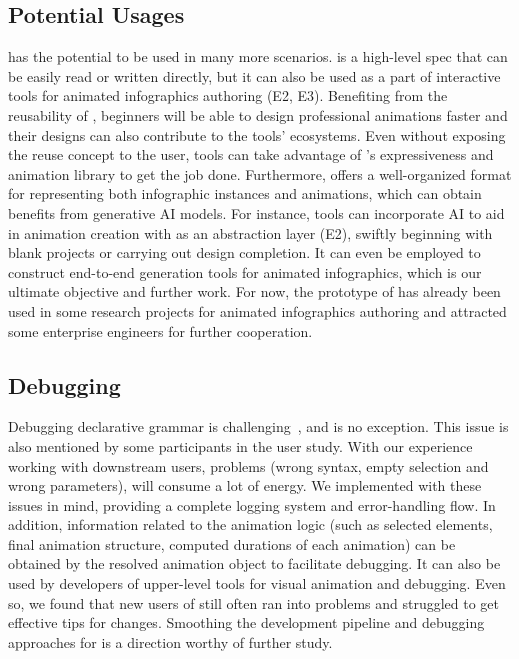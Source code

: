 \subsection{Potential Usages}
\gaia{} has the potential to be used in many more scenarios.
\gaia{} is a high-level spec that can be easily read or written directly, but it can also be used as a part of interactive tools for animated infographics authoring (E2, E3). 
Benefiting from the reusability of \gaia{}, beginners will be able to design professional animations faster and their designs can also contribute to the tools' ecosystems.
Even without exposing the reuse concept to the user, tools can take advantage of \gaia{}'s expressiveness and animation library to get the job done.
Furthermore, \gaia{} offers a well-organized format for representing both infographic instances and animations, which can obtain benefits from generative AI models. 
For instance, tools can incorporate AI to aid in animation creation with \gaia{} as an abstraction layer (E2), swiftly beginning with blank projects or carrying out design completion. 
It can even be employed to construct end-to-end generation tools for animated infographics, which is our ultimate objective and further work.
For now, the prototype of \gaia{} has already been used in some research projects for animated infographics authoring and attracted some enterprise engineers for further cooperation.

\subsection{Debugging}
Debugging declarative grammar is challenging~\cite{satyanarayan2015reactive}, and \gaia{} is no exception.
This issue is also mentioned by some participants in the user study.
With our experience working with downstream users, problems (\eg wrong syntax, empty selection and wrong parameters), will consume a lot of energy.
We implemented \gaia{} with these issues in mind, providing a complete logging system and error-handling flow. 
In addition, information related to the animation logic (such as selected elements, final animation structure, computed durations of each animation) can be obtained by the resolved animation object to facilitate debugging. 
It can also be used by developers of upper-level tools for visual animation and debugging.
Even so, we found that new users of \gaia{} still often ran into problems and struggled to get effective tips for changes. 
Smoothing the development pipeline and debugging approaches for \gaia{} is a direction worthy of further study.

